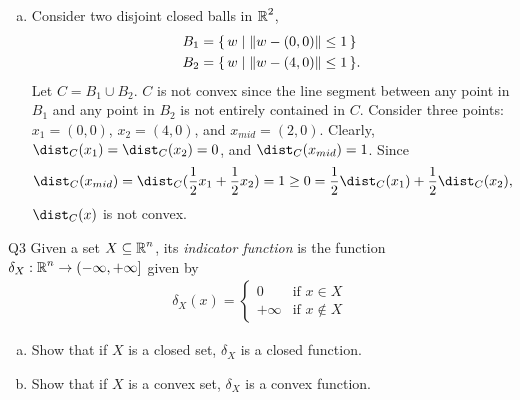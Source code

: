 \documentclass{article}
\begin{document}
\begin{solution}
\begin{enumerate}[(a)]
{\begin{proof}
\begin{enumerate}[(i)]
                    \item \textbf{Continuity:} Given two points $x, y\in \R^n$, let $w^*$ be the point in $C$ that achieves the infimum for $x$ (\ie $\norm{w^*-x}=\dist_C(x)$). Then
                    \begin{align*}
                        \dist_C(y)
                        &\leq \norm{w^* - y} \\
                        &= \norm{(w^* - x) + (x - y)} \\
                        &\leq \norm{w^* - x} + \norm{x - y} && \text{(by triangle inequality)} \\
                        &= \dist_C(x) + \norm{x - y}
                    \end{align*}
                    By symmetry, we can also show that $\dist_C(x)\leq\dist_C(y)+\norm{x-y}$. Therefore, we have $|\dist_C(x)-\dist_C(y)|\leq \norm{x-y}$. This means that $\dist_C(x)$ is Lipschitz continuous with modulus $1$, which implies continuity.
                \end{enumerate}
            \end{proof}
        }
        \item Consider two disjoint closed balls in $\operatorname{\mathbb{R}}^2$, {
            \begin{align*}
                B_1 &= \set{w \mid \norm{w-(0, 0)}\leq 1} \\
                B_2 &= \set{w \mid \norm{w-(4, 0)}\leq 1}.
            \end{align*}
        } Let $C=B_1\cup B_2$. $C$ is not convex since the line segment between any point in $B_1$ and any point in $B_2$ is not entirely contained in $C$. Consider three points: $x_1=(0,0)$, $x_2=(4,0)$, and $x_{mid}=(2,0)$. Clearly, $\dist_C(x_1)=\dist_C(x_2)=0$, and $\dist_C(x_{mid})=1$. Since
        \[
            \dist_C(x_{mid}) = \dist_C(\frac{1}{2}x_1+\frac{1}{2}x_2) =1 \geq 0 =\frac{1}{2}\dist_C(x_1) + \frac{1}{2}\dist_C(x_2),
        \]
        $\dist_C(x)$ is not convex.
    \end{enumerate}
\end{solution}

\begin{problem}
    {Q3}
    Given a set $X\subseteq\operatorname{\mathbb{R}}^n$, its \textit{indicator function} is the function $\delta_X:\operatorname{\mathbb{R}}^n\rightarrow(-\infty, +\infty]$ given by
    \begin{align*}
        \delta_X(x) = \begin{cases}
            0 & \text{if } x\in X\\
            +\infty & \text{if } x\notin X
        \end{cases}
    \end{align*}
    \begin{enumerate}[(a)]
        \item Show that if $X$ is a closed set, $\delta_X$ is a closed function.
        \item Show that if $X$ is a convex set, $\delta_X$ is a convex function.
    \end{enumerate}
\end{problem}
\end{document}
